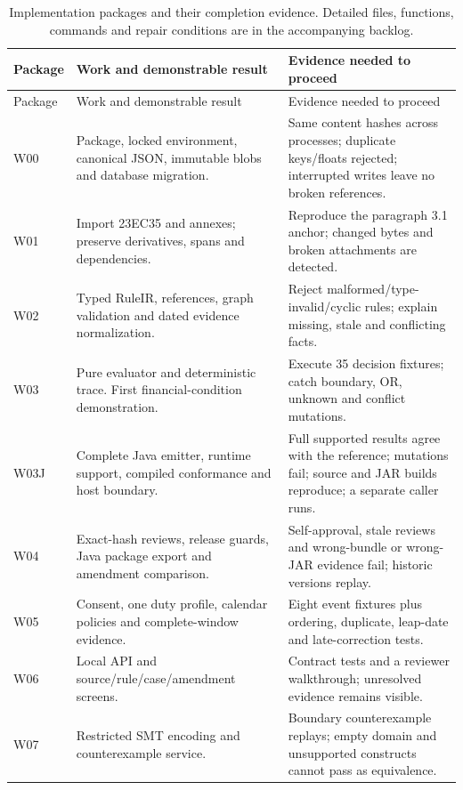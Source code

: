 
\begingroup\small
\begin{longtable}{P{0.12\textwidth}P{0.42\textwidth}P{0.36\textwidth}}
\caption{Implementation packages and their completion evidence. Detailed files,
functions, commands and repair conditions are in the accompanying backlog.}\label{tab:phases}\\
\toprule Package & Work and demonstrable result & Evidence needed to proceed \\\midrule
\endfirsthead
\toprule Package & Work and demonstrable result & Evidence needed to proceed \\\midrule
\endhead
W00 & Package, locked environment, canonical JSON, immutable blobs and database migration. & Same content hashes across processes; duplicate keys/floats rejected; interrupted writes leave no broken references.\\
W01 & Import 23EC35 and annexes; preserve derivatives, spans and dependencies. & Reproduce the paragraph 3.1 anchor; changed bytes and broken attachments are detected.\\
W02 & Typed RuleIR, references, graph validation and dated evidence normalization. & Reject malformed/type-invalid/cyclic rules; explain missing, stale and conflicting facts.\\
W03 & Pure evaluator and deterministic trace. First financial-condition demonstration. & Execute 35 decision fixtures; catch boundary, OR, unknown and conflict mutations.\\
W03J & Complete Java emitter, runtime support, compiled conformance and host boundary. & Full supported results agree with the reference; mutations fail; source and JAR builds reproduce; a separate caller runs.\\
W04 & Exact-hash reviews, release guards, Java package export and amendment comparison. & Self-approval, stale reviews and wrong-bundle or wrong-JAR evidence fail; historic versions replay.\\
W05 & Consent, one duty profile, calendar policies and complete-window evidence. & Eight event fixtures plus ordering, duplicate, leap-date and late-correction tests.\\
W06 & Local API and source/rule/case/amendment screens. & Contract tests and a reviewer walkthrough; unresolved evidence remains visible.\\
W07 & Restricted SMT encoding and counterexample service. & Boundary counterexample replays; empty domain and unsupported constructs cannot pass as equivalence.\\

\end{longtable}

